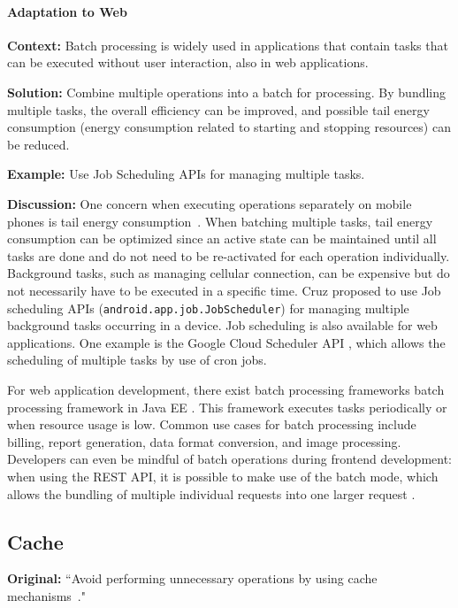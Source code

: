 \paragraph{Adaptation to Web}\mbox{}

\textbf{Context:} Batch processing is widely used in applications that contain tasks that can be executed without user interaction, also in web applications.

\textbf{Solution:} Combine multiple operations into a batch for processing. By bundling multiple tasks, the overall efficiency can be improved, and possible tail energy consumption (energy consumption related to starting and stopping resources) can be reduced.

\textbf{Example:} Use Job Scheduling APIs for managing multiple tasks.



\textbf{Discussion:} One concern when executing operations separately on mobile phones is tail energy consumption~\cite{cruz2019catalog}. When batching multiple tasks, tail energy consumption can be optimized since an active state can be maintained until all tasks are done and do not need to be re-activated for each operation individually. Background tasks, such as managing cellular connection, can be expensive but do not necessarily have to be executed in a specific time. Cruz \etal proposed to use Job scheduling APIs (\eg \texttt{android.app.job.JobScheduler}) for managing multiple background tasks occurring in a device. Job scheduling is also available for web applications. One example is the Google Cloud Scheduler API \cite{Google-cloude-scheduler-api}, which allows the scheduling of multiple tasks by use of cron jobs.

For web application development, there exist batch processing frameworks \eg batch processing framework in Java EE \cite{javaee-batch-processing}. This framework executes tasks periodically or when resource usage is low.
Common use cases for batch processing include billing, report generation, data format conversion, and image processing. Developers can even be mindful of batch operations during frontend development: when using the REST API, it is possible to make use of the batch mode, which allows the bundling of multiple individual requests into one larger request \cite{rest-api-batch-example} \cite{microsoft-batch-operations}.


\subsection{Cache} \label{sec:patterns-Cache}
\textbf{Original:} ``Avoid performing unnecessary operations by using cache mechanisms~\cite{cruz2019catalog}."

